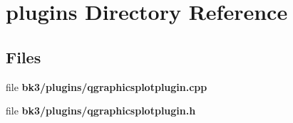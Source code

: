 \section{plugins Directory Reference}
\label{dir_dfd7eaa514baec9d9bca33df73c25350}
\subsection*{Files}
\begin{DoxyCompactItemize}
\item 
file {\bf bk3/plugins/qgraphicsplotplugin.\+cpp}
\item 
file {\bf bk3/plugins/qgraphicsplotplugin.\+h}
\end{DoxyCompactItemize}
